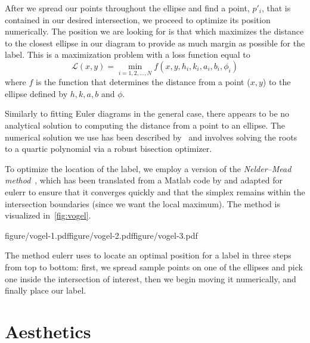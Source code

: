 \documentclass[
  oneside,
  openany,
  numbers=noendperiod,
  parskip=half,
  bibliography=totoc
]{scrbook}\usepackage[]{graphicx}\usepackage{xcolor}
\newcommand{\proglang}[1]{\textsf{#1}}
\newcommand{\pkg}[1]{{\fontseries{b}\selectfont #1}}
\begin{document}
After we spread our points throughout the ellipse and find a point, $p'_i$, that
is contained in our desired intersection, we proceed to optimize its position
numerically. The position we are looking for is that which maximizes the
distance to the closest ellipse in our diagram to provide as much margin as
possible for the label. This is a maximization problem with a loss function equal to
\begin{equation}
\mathcal{L}(x,y) = \min_{i=1,2,\dots,N} f(x,y,h_i,k_i,a_i,b_i,\phi_i)
\label{eq:lossDist}
\end{equation}
where $f$ is the function that determines the distance from a point ($x,y$) to
the ellipse defined by $h,k,a,b$ and $\phi$.

Similarly to fitting Euler diagrams in the general case, there appears to be no
analytical solution to computing the distance from a point to an ellipse. The
numerical solution we use has been described by~\citet{Eberly_2016a} and
involves solving the roots to a quartic polynomial via a robust
bisection optimizer.

To optimize the location of the label, we employ a version of the
\emph{Nelder--Mead method}~\citep{Nelder_1965}, which has been translated from
a \proglang{Matlab} code by \citet{Kelley_1999} and adapted for \pkg{eulerr} to
ensure that it converges quickly and that the simplex remains within the
intersection boundaries (since we want the local maximum). The method is
visualized in~\cref{fig:vogel}.
\begin{marginfigure}
figure/vogel-1.pdffigure/vogel-2.pdffigure/vogel-3.pdf
\caption{The method eulerr uses to locate an optimal position for a label in
three steps from top to bottom: first, we spread sample points on one of the
ellipses and pick one inside the intersection of interest, then we begin moving
it numerically, and finally place our label.}
\label{fig:vogel}
\end{marginfigure}

\section{Aesthetics}
\label{sec:aesthetics}
\end{document}
